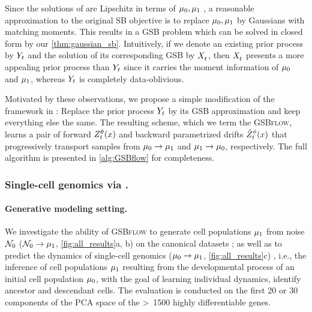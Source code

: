 Since the solutions of  are Lipschitz in terms of $\mu_0,\mu_1$ \citep{carlier2022lipschitz}, a reasonable approximation to the original \acrshort{SB} objective is to replace $\mu_0,\mu_1$ by Gaussians with matching moments. This results in a \acrshort{GSB} problem which can be solved in closed form by our \cref{thm:gaussian_sb}. Intuitively, if we denote an existing prior process by $Y_{ t }$ and the solution of its corresponding \acrshort{GSB} by $X^{}_{ t }$, then $X^{}_{ t }$ presents a more appealing prior process than $Y_{ t }$ since it carries the moment information of $\mu_0$ and $\mu_1$, whereas $Y_{ t }$ is completely data-oblivious.

Motivated by these observations, we propose a simple modification of the framework in \citet{chen2021likelihood}: Replace the prior process $Y_{ t }$ by its \acrshort{GSB} approximation and keep everything else the same. The resulting scheme, which we term the \textsc{GSBflow}, learns a pair of forward {\color{pink} $\SBf$} and backward parametrized drifts {\color{blue} $\SBb$} that progressively transport samples from $\mu_0 \rightarrow \mu_1$ and $\mu_1 \rightarrow \mu_0$, respectively. The full algorithm is presented in \cref{alg:GSBflow} for completeness.

\subsubsection*{Single-cell genomics via .}

\paragraph{Generative modeling setting.}
 We investigate the ability of \textsc{GSBflow} to generate cell populations $\mu_1$ from noise $\mathcal{N}_0$ ($\mathcal{N}_0 \rightarrow \mu_1$, \cref{fig:all_results}a, b) on the canonical datasets \citep{moon2019visualizing, schiebinger2019optimal}; as well as to predict the dynamics of single-cell genomics ($\mu_0 \rightarrow \mu_1$, \cref{fig:all_results}c) \citep{moon2019visualizing}, i.e., the inference of cell populations $\mu_1$ resulting from the developmental process of an initial cell population $\mu_0$, with the goal of learning individual dynamics, identify ancestor and descendant cells. 
The evaluation is conducted on the first 20 or 30 components of the PCA space of the >~1500 highly differentiable genes.

